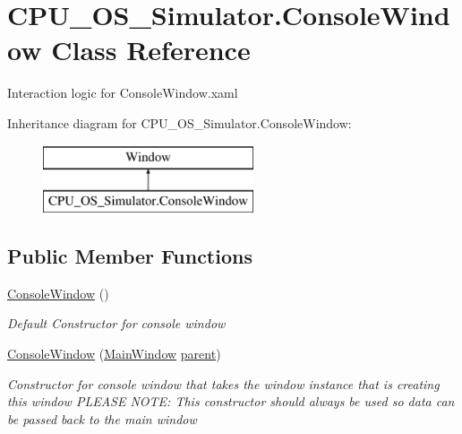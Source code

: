 \hypertarget{class_c_p_u___o_s___simulator_1_1_console_window}{}\section{C\+P\+U\+\_\+\+O\+S\+\_\+\+Simulator.\+Console\+Window Class Reference}
\label{class_c_p_u___o_s___simulator_1_1_console_window}


Interaction logic for Console\+Window.\+xaml  


Inheritance diagram for C\+P\+U\+\_\+\+O\+S\+\_\+\+Simulator.\+Console\+Window\+:\begin{figure}[H]
\begin{center}
\leavevmode
\includegraphics[height=2.000000cm]{class_c_p_u___o_s___simulator_1_1_console_window}
\end{center}
\end{figure}
\subsection*{Public Member Functions}
\begin{DoxyCompactItemize}
\item 
\hyperlink{class_c_p_u___o_s___simulator_1_1_console_window_abdd222b591f72c19297dc5805059ee7e}{Console\+Window} ()
\begin{DoxyCompactList}\small\item\em Default Constructor for console window \end{DoxyCompactList}\item 
\hyperlink{class_c_p_u___o_s___simulator_1_1_console_window_a4e79b8ceea62fb4bb44c63b7fdd7c6bb}{Console\+Window} (\hyperlink{class_c_p_u___o_s___simulator_1_1_main_window}{Main\+Window} \hyperlink{class_c_p_u___o_s___simulator_1_1_console_window_a1e38326bb40f4ed44c4964d94dc6f809}{parent})
\begin{DoxyCompactList}\small\item\em Constructor for console window that takes the window instance that is creating this window P\+L\+E\+A\+S\+E N\+O\+T\+E\+: This constructor should always be used so data can be passed back to the main window \end{DoxyCompactList}\end{DoxyCompactItemize}
